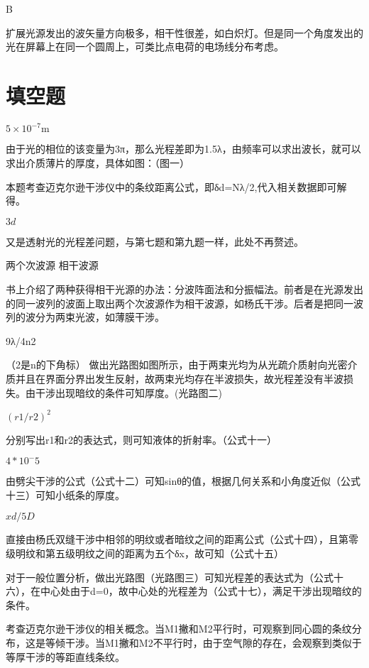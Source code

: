 \exercise B

\solve 扩展光源发出的波矢量方向极多，相干性很差，如白炽灯。但是同一个角度发出的光在屏幕上在同一个圆周上，可类比点电荷的电场线分布考虑。
\section{填空题}
\exercise $5\times10^{-7}\mathrm{m}$ 

\solve 由于光的相位的该变量为3π，那么光程差即为1.5λ，由频率可以求出波长，就可以求出介质薄片的厚度，具体如图：（图一）


\solve 本题考查迈克尔逊干涉仪中的条纹距离公式，即δd=Nλ/2,代入相关数据即可解得。

\exercise $3d$

\solve  又是透射光的光程差问题，与第七题和第九题一样，此处不再赘述。

\exercise 两个次波源 \quad 相干波源 

\solve 书上介绍了两种获得相干光源的办法：分波阵面法和分振幅法。前者是在光源发出的同一波列的波面上取出两个次波源作为相干波源，如杨氏干涉。后者是把同一波列的波分为两束光波，如薄膜干涉。

\exercise 9λ/4n2

\solve （2是n的下角标） 做出光路图如图所示，由于两束光均为从光疏介质射向光密介质并且在界面分界出发生反射，故两束光均存在半波损失，故光程差没有半波损失。由干涉出现暗纹的条件可知厚度。(光路图二)

\exercise $(r1/r2)^2$

\solve 分别写出r1和r2的表达式，则可知液体的折射率。（公式十一）

\exercise $4*10^-5$

\solve 由劈尖干涉的公式（公式十二）可知sinθ的值，根据几何关系和小角度近似（公式十三）可知小纸条的厚度。

\exercise $xd/5D$

\solve 直接由杨氏双缝干涉中相邻的明纹或者暗纹之间的距离公式（公式十四），且第零级明纹和第五级明纹之间的距离为五个δx，故可知（公式十五）

\exercise 

\solve 对于一般位置分析，做出光路图（光路图三）可知光程差的表达式为（公式十六），在中心处由于d=0，故中心处的光程差为（公式十七），满足干涉出现暗纹的条件。

\exercise 

\solve 考查迈克尔逊干涉仪的相关概念。当M1撇和M2平行时，可观察到同心圆的条纹分布，这是等倾干涉。当M1撇和M2不平行时，由于空气隙的存在，会观察到类似于等厚干涉的等距直线条纹。

